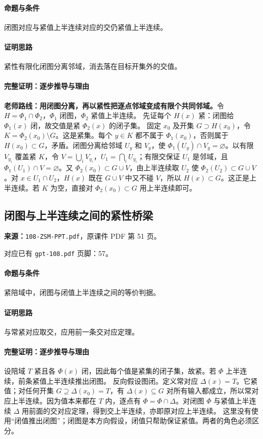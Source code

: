 \paragraph{命题与条件}闭图对应与紧值上半连续对应的交仍紧值上半连续。
\paragraph{证明思路}紧性有限化闭图分离邻域，消去落在目标开集外的交值。
\paragraph{完整证明：逐步推导与理由}
\textbf{老师路线：用闭图分离，再以紧性把逐点邻域变成有限个共同邻域。}令 $H=\Phi_1\cap\Phi_2$，$\Phi_1$ 闭图，$\Phi_2$ 紧值上半连续。
先证每个 $H(x)$ 紧：闭图给 $\Phi_1(x)$ 闭，故交值是紧 $\Phi_2(x)$ 的闭子集。
固定 $x_0$ 及开集 $G\supset H(x_0)$，令 $K=\Phi_2(x_0)\setminus G$。这是紧集。每个 $y\in K$ 都不属于 $\Phi_1(x_0)$，否则属于 $H(x_0)\subset G$，矛盾。闭图分离给邻域 $U_y$ 和 $V_y$，使 $\Phi_1(U_y)\cap V_y=\varnothing$。以有限 $V_{y_i}$ 覆盖紧 $K$，令 $V=\bigcup_i V_{y_i}$，$U_1=\bigcap_iU_{y_i}$；有限交保证 $U_1$ 是邻域，且 $\Phi_1(U_1)\cap V=\varnothing$。又 $\Phi_2(x_0)\subset G\cup V$，由上半连续取 $U_2$ 使 $\Phi_2(U_2)\subset G\cup V$。对 $x\in U_1\cap U_2$，$H(x)$ 既在 $G\cup V$ 中又不碰 $V$，所以 $H(x)\subset G$。这正是上半连续。若 $K$ 为空，直接对 $\Phi_2(x_0)\subset G$ 用上半连续即可。
\clearpage\subsection{闭图与上半连续之间的紧性桥梁}
\textbf{来源：}\texttt{108-ZSM-PPT.pdf}，原课件 PDF 第 51 页。\par
对应已有 \texttt{gpt-108.pdf} 页脚：57。\par
\paragraph{命题与条件}紧陪域中，闭图与闭值上半连续之间的等价判据。
\paragraph{证明思路}与常紧对应取交，应用前一条交对应定理。
\paragraph{完整证明：逐步推导与理由}

设陪域 $T$ 紧且各 $\Phi(x)$ 闭，因此每个值是紧集的闭子集，故紧。若 $\Phi$ 上半连续，前条紧值上半连续推出闭图。
反向假设图闭。定义常对应 $\Delta(x)=T$。它紧值；对任何开集 $G\supseteq\Delta(x_0)=T$，有 $\Delta(x)\subseteq G$ 对所有输入都成立，所以常对应上半连续。因为值本来都在 $T$ 内，逐点有 $\Phi=\Phi\cap\Delta$。对闭图 $\Phi$ 与紧值上半连续 $\Delta$ 用前面的交对应定理，得到交上半连续，亦即原对应上半连续。
这里没有使用“闭值推出闭图”；闭图是本方向假设，闭值只帮助保证紧值。两者的角色必须区分。

